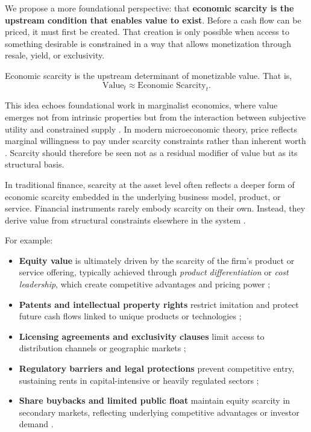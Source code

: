 \documentclass[12pt]{article}
\begin{document}
We propose a more foundational perspective: that \textbf{economic scarcity is the upstream condition that enables value to exist}. Before a cash flow can be priced, it must first be created. That creation is only possible when access to something desirable is constrained in a way that allows monetization through resale, yield, or exclusivity.

\begin{tcolorbox}[title=\textbf{Proposition 1}]
Economic scarcity is the upstream determinant of monetizable value. That is,
\begin{equation}
\text{Value}_t \approx \text{Economic Scarcity}_t.
\end{equation}
\end{tcolorbox}

This idea echoes foundational work in marginalist economics, where value emerges not from intrinsic properties but from the interaction between subjective utility and constrained supply \citep{menger1871principles, jevons1871political}. In modern microeconomic theory, price reflects marginal willingness to pay under scarcity constraints rather than inherent worth \citep{varian1992microeconomic}. Scarcity should therefore be seen not as a residual modifier of value but as its structural basis.

In traditional finance, scarcity at the asset level often reflects a deeper form of economic scarcity embedded in the underlying business model, product, or service. Financial instruments rarely embody scarcity on their own. Instead, they derive value from structural constraints elsewhere in the system \citep{tirole1988theory, porter1985competitive, demsetz1973industry}.

For example:
\begin{itemize}
    \item \textbf{Equity value} is ultimately driven by the scarcity of the firm’s product or service offering, typically achieved through \textit{product differentiation} or \textit{cost leadership}, which create competitive advantages and pricing power \citep{porter1985competitive};

    \item \textbf{Patents and intellectual property rights} restrict imitation and protect future cash flows linked to unique products or technologies \citep{shapiro1985licensing, gallini2002intellectual};

    \item \textbf{Licensing agreements and exclusivity clauses} limit access to distribution channels or geographic markets \citep{caves1983contractual, jaffe1993geographic};

    \item \textbf{Regulatory barriers and legal protections} prevent competitive entry, sustaining rents in capital-intensive or heavily regulated sectors \citep{demsetz1973industry, stigler1971regulation};

    \item \textbf{Share buybacks and limited public float} maintain equity scarcity in secondary markets, reflecting underlying competitive advantages or investor demand \citep{pontiff2006liquidity}.
\end{itemize}
\end{document}
